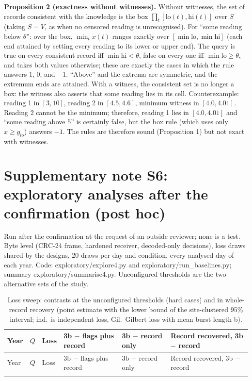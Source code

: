 ﻿\documentclass[12pt]{article}
\begin{document}
\textbf{Proposition 2 (exactness without witnesses).} Without witnesses, the set of records consistent with the knowledge is the box $\prod_t [\mathrm{lo}(t), \mathrm{hi}(t)]$ over $S$ (taking $S = V$, as when no censored reading is unrecognised). For ``some reading below $\theta$'': over the box, $\min_t x(t)$ ranges exactly over $[\min \mathrm{lo}, \min \mathrm{hi}]$ (each end attained by setting every reading to its lower or upper end). The query is true on every consistent record iff $\min \mathrm{hi} < \theta$, false on every one iff $\min \mathrm{lo} \ge \theta$, and takes both values otherwise; these are exactly the cases in which the rule answers 1, 0, and $-1$. ``Above'' and the extrema are symmetric, and the extremum ends are attained. With a witness, the consistent set is no longer a box: the witness also asserts that some reading lies in its cell. Counterexample: reading 1 in $[3, 10]$, reading 2 in $[4.5, 4.6]$, minimum witness in $[4.0, 4.01]$. Reading 2 cannot be the minimum; therefore, reading 1 lies in $[4.0, 4.01]$ and ``some reading above 5'' is certainly false, but the box rule (which uses only $x \ge g_{lo}$) answers $-1$. The rules are therefore sound (Proposition 1) but not exact with witnesses.

\section*{Supplementary note S6: exploratory analyses after the confirmation (post hoc)}
Run after the confirmation at the request of an outside reviewer; none is a test. Byte level (CRC-24 frame, hardened receiver, decoded-only decisions), loss draws shared by the designs, 20 draws per day and condition, every analysed day of each year. Code: exploratory/explore4.py and exploratory/run\_baselines.py; summary exploratory/summarise4.py. Unconfigured thresholds are the two alternative sets of the study.

{\footnotesize
\begin{longtable}{@{}llllll@{}}
\caption{Loss sweep: contrasts at the unconfigured thresholds (hard cases) and in whole-record recovery (point estimate with the lower bound of the site-clustered 95\% interval; ind.\ is independent loss, Gil.\ Gilbert loss with mean burst length b).}\\
\toprule
Year & $Q$ & Loss & 3b $-$ flags plus record & 3b $-$ record only & Record recovered, 3b $-$ record \\
\midrule
\endfirsthead
\toprule
Year & $Q$ & Loss & 3b $-$ flags plus record & 3b $-$ record only & Record recovered, 3b $-$ record \\
\midrule
\endhead
\bottomrule
\endfoot

\end{longtable}
}
\end{document}
